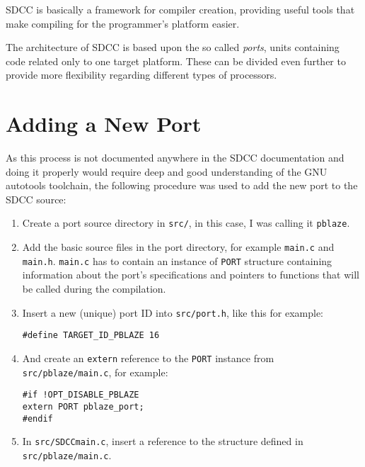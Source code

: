 SDCC is basically a framework for compiler creation, providing useful tools that make compiling for the programmer's platform easier.

The architecture of SDCC is based upon the so called \emph{ports}, units containing code related only to one target platform. These can be divided even further to provide more flexibility regarding different types of processors.

    \section{Adding a New Port}

    As this process is not documented anywhere in the SDCC documentation and doing it properly would require deep and good understanding of the GNU autotools toolchain, the following procedure was used to add the new port to the SDCC source:

    \begin{enumerate}

    \item Create a port source directory in \texttt{src/}, in this case, I was calling it \texttt{pblaze}.

    \item Add the basic source files in the port directory, for example \texttt{main.c} and \texttt{main.h}. \texttt{main.c} has to contain an instance of \texttt{PORT} structure containing information about the port's specifications and pointers to functions that will be called during the compilation.

    \item Insert a new (unique) port ID into \texttt{src/port.h}, like this for example:

    \texttt{\#define TARGET\_ID\_PBLAZE    16}

    \item And create an \texttt{extern} reference to the \texttt{PORT} instance from \texttt{src/pblaze/main.c}, for example:

\begin{verbatim}#if !OPT_DISABLE_PBLAZE
extern PORT pblaze_port;
#endif\end{verbatim}

    \item In \texttt{src/SDCCmain.c}, insert a reference to the structure defined in \texttt{src/pblaze/main.c}.

    \end{enumerate}

